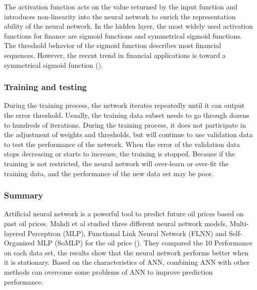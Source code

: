 The activation function acts on the value returned by the input function and introduces non-linearity into the neural network to enrich the representation ability of the neural network. In the hidden layer, the most widely used activation functions for finance are sigmoid functions and symmetrical sigmoid functions. The threshold behavior of the sigmoid function describes most financial sequences. However, the recent trend in financial applications is toward a symmetrical sigmoid function (\cite{Y6}).

\subsubsection{Training and testing}
During the training process, the network iterates repeatedly until it can output the error threshold. Usually, the training data subset needs to go through dozens to hundreds of iterations. During the training process, it does not participate in the adjustment of weights and thresholds, but will continue to use validation data to test the performance of the network. When the error of the validation data stops decreasing or starts to increase, the training is stopped. Because if the training is not restricted, the neural network will over-learn or over-fit the training data, and the performance of the new data set may be poor.


\subsubsection{Summary}
Artificial neural network is a powerful tool to predict future oil prices based on past oil prices. Mahdi et al studied three different neural network models, Multi-layered Perceptron (MLP), Functional Link Neural Network (FLNN) and Self-Organized MLP (SoMLP) for the oil price (\cite{Y7}). They compared the 10 Performance on each data set, the results show that the neural network performs better when it is stationary. Based on the characteristics of ANN, combining ANN with other methods can overcome some problems of ANN to improve prediction performance.

